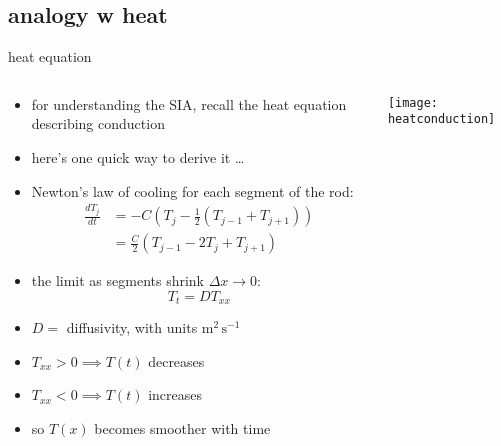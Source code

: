 \subsection{analogy w heat}

\begin{frame}{heat equation}

\small
\begin{columns}
\begin{column}{0.6\textwidth}
\begin{itemize}
\item for understanding the SIA, recall the heat equation describing conduction
\item here's one quick way to derive it \dots
\item Newton's law of cooling for each segment of the rod:
\begin{align*}
\frac{dT_j}{dt} &= - C \left(T_j - \frac{1}{2} (T_{j-1} + T_{j+1}) \right) \\
	&= \frac{C}{2} \left(T_{j-1} - 2 T_j + T_{j+1}\right) 
\end{align*}
\item the limit as segments shrink $\Delta x\to 0$:
	$$T_t = D T_{xx}$$
\item $D=$ diffusivity, with units $\text{m}^2\,\text{s}^{-1}$
\item $T_{xx}>0 \implies T(t)$ decreases
\item $T_{xx}<0 \implies T(t)$ increases
\item so $T(x)$ becomes smoother with time
\end{itemize}
\end{column}

\begin{column}{0.4\textwidth}
\hfill
\vspace{0.3in}
\texttt{[image: heatconduction]}
\end{column}
\end{columns}
\end{frame}


